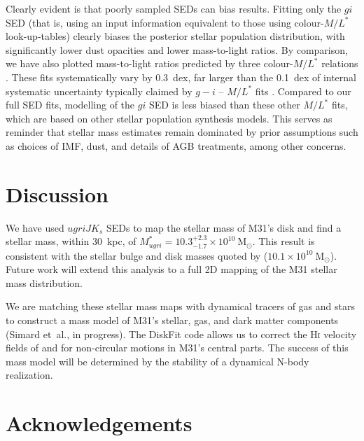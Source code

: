 \documentclass{iau}
\begin{document}
Clearly evident is that poorly sampled SEDs can bias results.
Fitting only the $gi$ SED (that is, using an input information equivalent to those using colour-$M/L^*$ look-up-tables) clearly biases the posterior stellar population distribution, with significantly lower dust opacities and lower mass-to-light ratios.
By comparison, we have also plotted mass-to-light ratios predicted by three colour-$M/L^*$ relations \citep{Zibetti:2009,Taylor:2011,Into:2013}.
These fits systematically vary by 0.3~dex, far larger than the 0.1~dex of internal systematic uncertainty typically claimed by $g-i$ -- $M/L^*$ fits \cite{Courteau:2013}.
Compared to our full SED fits, modelling of the $gi$ SED is less biased than these other $M/L^*$ fits, which are based on other stellar population synthesis models.
This serves as reminder that stellar mass estimates remain dominated by prior assumptions such as choices of IMF, dust, and details of AGB treatments, among other concerns.

\section{Discussion}

We have used $ugriJK_s$ SEDs to map the stellar mass of M31's disk and find a stellar mass, within $30$~kpc, of $M_{ugri}^{*} = 10.3^{+2.3}_{-1.7}\times 10^{10}~\mathrm{M}_\odot$.
This result is consistent with the stellar bulge and disk masses quoted by \cite{Tamm:2012} ($10.1\times10^{10}~\mathrm{M}_\odot$).
Future work will extend this analysis to a full 2D mapping of the M31 stellar mass distribution.

We are matching these stellar mass maps with dynamical tracers of gas and stars to construct a mass model of M31's stellar, gas, and dark matter components (Simard et~al., in progress). 
The DiskFit code \citep{Spekkens:2007} allows us to correct the H\textsc{i} velocity fields of \cite{Saglia:2010} and \cite{Chemin:2009} for non-circular motions in M31's central parts. 
The success of this mass model will be determined by the stability of a dynamical N-body realization.

\section*{Acknowledgements}
\end{document}
